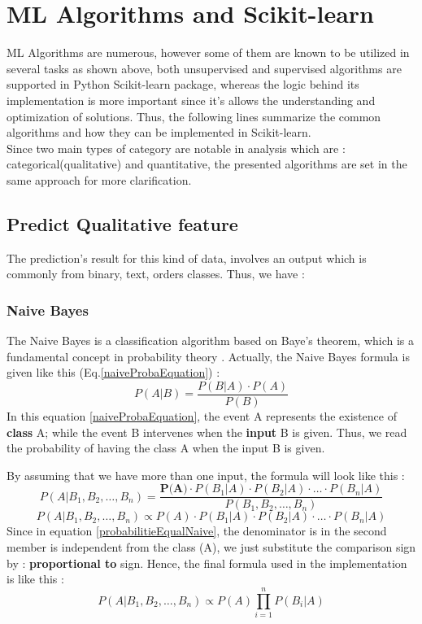 \documentclass[12pt,a4paper, oneside]{book}
\begin{document}
\section{ML Algorithms and Scikit-learn}  
ML Algorithms are numerous, however some of them are known to be utilized in several tasks as shown above, both unsupervised and supervised algorithms are supported in Python Scikit-learn package, whereas the logic behind its implementation is more important since it's allows the understanding and optimization of solutions. Thus, the following lines summarize the common algorithms and how they can be implemented in Scikit-learn.\\

Since two main types of category are notable in analysis which are : categorical(qualitative) and quantitative, the presented algorithms are set in the same approach for more clarification.

\subsection{Predict Qualitative feature} 
The prediction's result for this kind of data, involves an output which is commonly from binary, text, orders classes. Thus, we have : 
\subsubsection{Naive Bayes} 
The Naive Bayes is a classification algorithm based on Baye's theorem, which is a fundamental concept in probability theory \cite{maria2016performance}. 
Actually, the Naive Bayes formula is given like this (Eq.\ref{naiveProbaEquation}) : 
\begin{equation}
	\label{naiveProbaEquation}
	P(A|B) = \frac{P(B|A)  \cdot  P(A)}{P(B)}
\end{equation}
In this equation \ref{naiveProbaEquation}, the event A represents the existence of \textbf{class} A; while the event B intervenes when the \textbf{input} B is given. Thus, we read the probability of having the class A when the input B is given. 

\noindent By assuming that we have more than one input, the formula will look like this : 
\begin{equation} 
	\label{probabilitieEqualNaive}
	P(A | B_1, B_2, \ldots, B_n) = \frac{\textbf{P(A)} \cdot P(B_1 | A) \cdot P(B_2 | A) \cdot \ldots \cdot P(B_n | A)}{P(B_1, B_2, \ldots, B_n)}
\end{equation}  
\begin{equation}
	P(A | B_1, B_2, \ldots, B_n) \propto P(A) \cdot P(B_1 | A) \cdot P(B_2 | A) \cdot \ldots \cdot P(B_n | A)
\end{equation}
Since in equation \ref{probabilitieEqualNaive}, the denominator is in the second member is independent from the class (A), we just substitute the comparison sign by : \textbf{proportional to} sign. Hence, the final formula used in the implementation is like this :
\begin{equation}
P(A | B_1, B_2, \ldots, B_n) \propto P(A) \prod_{i=1}^{n} P(B_i | A)
\end{equation}
\end{document}
